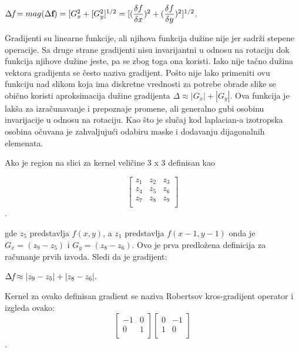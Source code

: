 \documentclass[a4paper,12pt,titlepage]{article}
\begin{document}
\begin{center}
	$\Delta \emph{f} = mag(\Delta \textbf{f}) = [G_{x}^{2} + [G_{y}^{2}]^{1/2} = [ (\dfrac{\delta f}{\delta x})^{2} +  (\dfrac{\delta f}{\delta y})^{2} ]^{1/2}$. \\
\end{center}

Gradijenti su linearne funkcije, ali njihova funkcija dužine nije jer sadrži stepene operacije. Sa druge strane gradijenti nisu invarijantni u odnosu na rotaciju dok funkcija njihove dužine jeste, pa se zbog toga ona koristi. Iako nije tačno dužina vektora gradijenta se često naziva gradijent. Pošto nije lako primeniti ovu funkciju nad slikom koja ima diskretne vrednosti za potrebe obrade slike se obično koristi aproksimacija dužine gradijenta $\Delta \approx |G_{x}| + |G_{y}|$. Ova funkcija je lakša za izračunavanje i prepoznaje promene, ali generalno gubi osobinu invarijacije u odnosu na rotaciju. Kao što je slučaj kod laplacian-a izotropska osobina očuvana je zahvaljujući odabiru maske i dodavanju dijagonalnih elemenata. 

Ako je region na slici za kernel veličine 3 x 3 definisan kao

 \[
\begin{bmatrix}
     z_{1} & z_{2} & z_{3} \\
     z_{4} & z_{5} & z_{6} \\
     z_{7} & z_{8} & z_{9} \\
\end{bmatrix}
\].

gde $z_{5}$ predstavlja $f(x, y)$, a $z_{1}$ predstavlja $f(x - 1, y - 1)$ onda je $G_{x} = (z_{9} - z_{5})$ i $G_{y} = (z_{8} - z_{6})$. Ovo je prva predložena definicija za računanje prvih izvoda. Sledi da je gradijent:

\begin{center}
$\Delta \emph{f} \approx |z_{9} - z_{5}| + |z_{8} - z_{6}|.$\\
\end{center}

Kernel za ovako definisan gradient se naziva Robertsov kros-gradijent operator i izgleda ovako:\\

 \[
\begin{bmatrix}
     -1 & 0 \\
     0 & 1 \\
\end{bmatrix}
\begin{bmatrix}
     0 & -1 \\
     1 & 0 \\
\end{bmatrix}
\].
\end{document}
